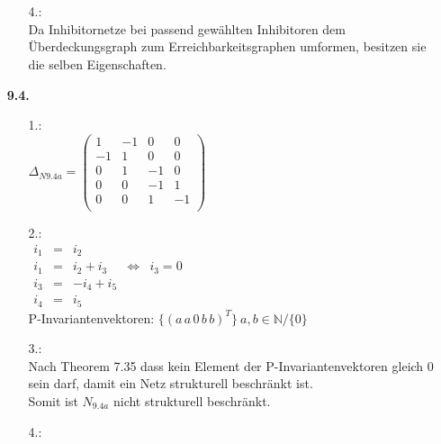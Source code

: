 \documentclass[a4paper,11pt,fleqn]{scrartcl}
\begin{document}
\begin{enumerate}
\begin{enumerate}
 \\ \\
			\item[4.:]\quad \\
				Da Inhibitornetze bei passend gewählten Inhibitoren dem Überdeckungsgraph zum
				Erreichbarkeitsgraphen umformen, besitzen sie die selben Eigenschaften.
		\end{enumerate}
		\item[\textbf{9.4.}]
		\begin{enumerate}
			\item[1.:]\quad \\
			\( \Delta_{N9.4a} =
			\begin{pmatrix}
				1 & -1 & 0 & 0 \\
				-1 & 1 & 0 & 0 \\
				0 & 1 & -1 & 0 \\
				0 & 0 & -1 & 1 \\
				0 & 0 & 1 & -1 \\
			\end{pmatrix}
			\)
			\item[2.:]\quad \\
			\(\begin{array}{rclcl}
				i_1 &=& i_2 \\
				i_1 &=& i_2 + i_3 &\Leftrightarrow & i_3 = 0 \\
				i_3 &=& -i_4 + i_5 \\
				i_4 &=& i_5
			\end{array}
			\) \\
			P-Invariantenvektoren: \(\Big\{(a\,a\,0\,b\,b)^T\Big\}\ a,b\in\mathbb{N}/\{0\}\)
			\item[3.:]\quad \\
				Nach Theorem 7.35 dass kein Element der P-Invariantenvektoren gleich 0 sein darf, damit ein Netz
				strukturell beschränkt ist. \\
				Somit ist \(N_{9.4a}\) nicht strukturell beschränkt.
			\item[4.:]\quad \\
			\begin{itemize}

\end{itemize}
\end{enumerate}
\end{enumerate}
\end{document}

